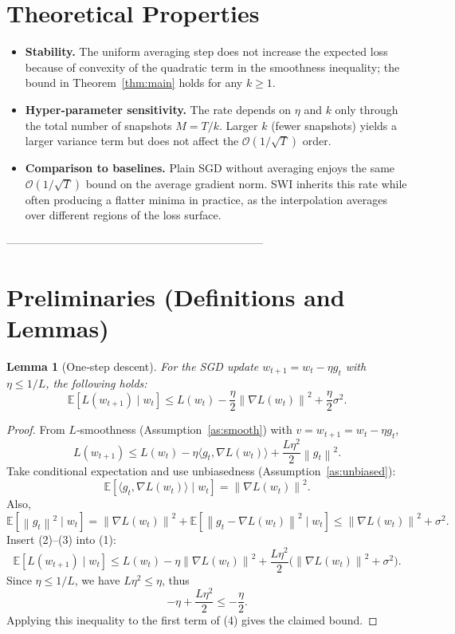 \documentclass{article}
\newtheorem{lemma}{Lemma}
\newcommand{\E}{\mathbb{E}}
\newcommand{\norm}[1]{\left\lVert #1\right\rVert}
\begin{document}
\section*{Theoretical Properties}
\begin{itemize}
  \item \textbf{Stability.} The uniform averaging step does not increase the expected loss because of convexity of the quadratic term in the smoothness inequality; the bound in Theorem~\ref{thm:main} holds for any $k\ge1$.
  \item \textbf{Hyper‑parameter sensitivity.} The rate depends on $\eta$ and $k$ only through the total number of snapshots $M=T/k$. Larger $k$ (fewer snapshots) yields a larger variance term but does not affect the $\mathcal{O}(1/\sqrt{T})$ order.
  \item \textbf{Comparison to baselines.} Plain SGD without averaging enjoys the same $\mathcal{O}(1/\sqrt{T})$ bound on the average gradient norm. SWI inherits this rate while often producing a flatter minima in practice, as the interpolation averages over different regions of the loss surface.
\end{itemize}

---------------------------------------------------------------------

\section*{Preliminaries (Definitions and Lemmas)}
\begin{lemma}[One‑step descent]\label{lem:descent}
For the SGD update $w_{t+1}=w_t-\eta g_t$ with $\eta\le1/L$, the following holds:
\[
\E\!\left[L(w_{t+1})\mid w_t\right]
\le L(w_t)-\frac{\eta}{2}\norm{\nabla L(w_t)}^2
+\frac{\eta}{2} \sigma^2 .
\]
\end{lemma}
\begin{proof}
From $L$‑smoothness (Assumption~\ref{as:smooth}) with $v=w_{t+1}=w_t-\eta g_t$,
\[
L(w_{t+1})\le L(w_t)-\eta\langle g_t,\nabla L(w_t)\rangle
+\frac{L\eta^2}{2}\norm{g_t}^2. \tag{1}
\]
Take conditional expectation and use unbiasedness (Assumption~\ref{as:unbiased}):
\[
\E\!\left[\langle g_t,\nabla L(w_t)\rangle\mid w_t\right]
= \norm{\nabla L(w_t)}^2 . \tag{2}
\]
Also,
\[
\E\!\left[\norm{g_t}^2\mid w_t\right]
= \norm{\nabla L(w_t)}^2+\E\!\left[\norm{g_t-\nabla L(w_t)}^2\mid w_t\right]
\le \norm{\nabla L(w_t)}^2+\sigma^2 . \tag{3}
\]
Insert (2)–(3) into (1):
\[
\E\!\left[L(w_{t+1})\mid w_t\right]\le
L(w_t)-\eta\norm{\nabla L(w_t)}^2
+\frac{L\eta^2}{2}\bigl(\norm{\nabla L(w_t)}^2+\sigma^2\bigr). \tag{4}
\]
Since $\eta\le 1/L$, we have $L\eta^2\le\eta$, thus
\[
-\eta+\frac{L\eta^2}{2}\le -\frac{\eta}{2}.
\]
Applying this inequality to the first term of (4) gives the claimed bound.
\end{proof}
\end{document}
